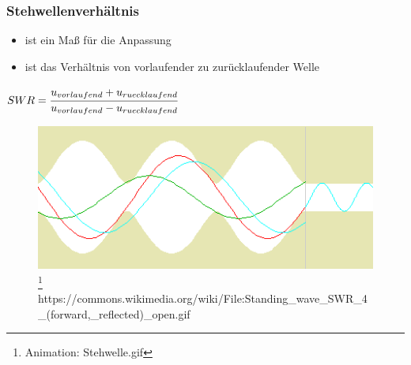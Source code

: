 \begin{frame}
\frametitle{Stehwellenverhältnis}
\begin{itemize}
	\item ist ein Maß für die Anpassung
	\item ist das Verhältnis von vorlaufender zu zurücklaufender Welle
\end{itemize}
\begin{block}{}
  \centering $SWR = \cfrac{u_{vorlaufend}+u_{ruecklaufend}}{u_{vorlaufend}-u_{ruecklaufend}}$ 
\end{block}
\begin{center}
  \begin{figure}
  \includegraphics[width=\textwidth,height=0.3\textheight,keepaspectratio]{e10/Stehwelle-10.png}
  \footnote{Animation: Stehwelle.gif\cite{stehwelle}}
           {https://commons.wikimedia.org/wiki/File:Standing_wave_SWR_4_(forward,_reflected)_open.gif}{\cczero}
  \end{figure}
\end{center}
\end{frame}

